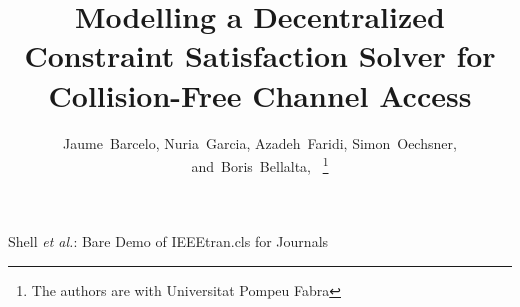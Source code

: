 \documentclass[journal]{IEEEtran}
\begin{document}
%
\title{Modelling a Decentralized Constraint Satisfaction Solver for Collision-Free Channel Access}
%
%
%

\author{Jaume~Barcelo, %
        Nuria~Garcia, %
        Azadeh~Faridi, %
        Simon~Oechsner, %
        and~Boris~Bellalta,~%
\thanks{The authors are with Universitat Pompeu Fabra}}

%
%



%
{Shell \MakeLowercase{\textit{et al.}}: Bare Demo of IEEEtran.cls for Journals}
%
\end{document}
